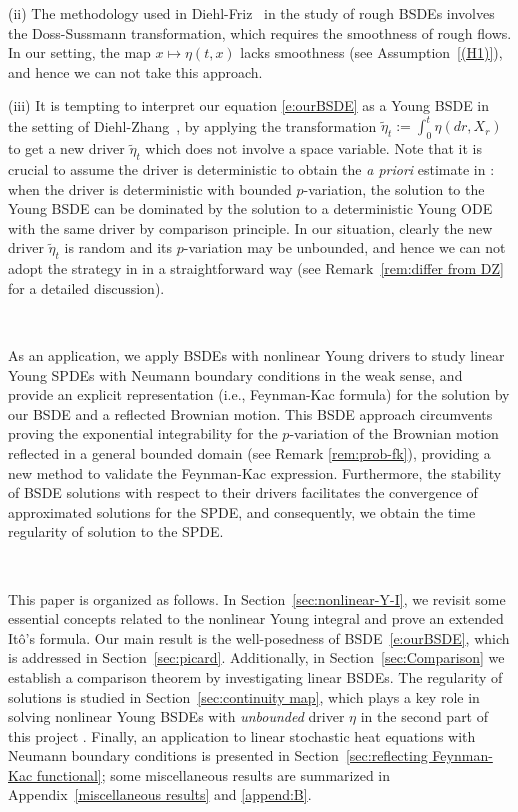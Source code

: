\documentclass[11pt,reqno]{amsart}
\numberwithin{equation}{section}
\begin{document}
(ii) The methodology used in Diehl-Friz~\cite{DiehlFriz} in the study of rough BSDEs involves the Doss-Sussmann transformation, which requires the smoothness of rough flows. In our setting, the map $x\mapsto\eta(t,x)$ lacks smoothness (see Assumption~\ref{(H1)}), and hence we can not take this approach. 


(iii) It is tempting to interpret our equation \eqref{e:ourBSDE} as a Young BSDE in the setting of Diehl-Zhang~\cite{DiehlZhang}, by applying the transformation $\tilde{\eta}_t := \int_{0}^{t} \eta(dr , X_r)$ to get a new driver $\tilde \eta_t$ which does not involve a space variable. Note that it is crucial to assume the driver is deterministic to obtain the \emph{a priori} estimate in \cite{DiehlZhang}: when the driver is deterministic with bounded $p$-variation, the solution to the Young BSDE can be dominated by the solution to a deterministic Young ODE with the same driver by comparison principle. In our situation, clearly the new driver $\tilde{\eta}_t$ is random and its $p$-variation may be unbounded, and hence we can not adopt the strategy in \cite{DiehlZhang} in a straightforward way (see Remark~\ref{rem:differ from DZ} for a detailed discussion).

\

 
As an application, we apply BSDEs with nonlinear Young drivers to study linear Young SPDEs with Neumann boundary conditions in the weak sense, and provide an explicit representation (i.e., Feynman-Kac formula) for the solution by our BSDE and a reflected Brownian motion.
This BSDE approach circumvents proving the exponential integrability for the $p$-variation of the Brownian motion reflected in a general bounded domain (see Remark \ref{rem:prob-fk}), providing a new method to validate the Feynman-Kac expression. Furthermore, the stability of BSDE solutions with respect to their drivers facilitates the convergence of approximated solutions for the SPDE, and consequently, we obtain the time regularity of  solution to  the SPDE.

\ \ \ \ \ 

This paper is organized as follows. In Section~\ref{sec:nonlinear-Y-I}, we revisit some essential concepts related to the nonlinear Young integral and prove an extended It\^o's formula. Our main result is the well-posedness of BSDE~\eqref{e:ourBSDE}, which is addressed in Section~\ref{sec:picard}. Additionally,  in Section~\ref{sec:Comparison} we establish a comparison theorem by investigating linear BSDEs. The regularity of  solutions is studied in Section~\ref{sec:continuity map}, which plays a key role in solving nonlinear Young BSDEs with \emph{unbounded} driver $\eta$ in the second part  of this project \cite{BSDEYoung-II}.  Finally, an application to linear stochastic heat equations with Neumann boundary conditions is presented in Section~\ref{sec:reflecting Feynman-Kac functional}; some miscellaneous results are summarized in Appendix~\ref{miscellaneous results} and \ref{append:B}.
\end{document}
